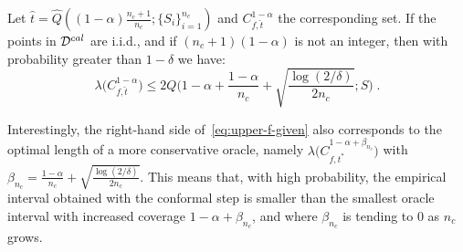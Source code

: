 \begin{proposition}
    \label{prop:upper-f-given}
    Let $\hat{t} = \widehat{Q}((1-\alpha)\frac{n_c+1}{n_c};\{S_i\}_{i=1}^{n_c})$ and $C^{1-\alpha}_{f,\hat{t}}$ the corresponding set. If the points in ${\cal D}^{cal}$ are i.i.d., and if $(n_c+1)(1-\alpha)$ is not an integer, then with probability greater than $1-\delta$ we have:
    \begin{equation}
        \label{eq:upper-f-given}
        \lambda\Big(C^{1-\alpha}_{f,\hat{t}}\Big) \leq 2Q\Big(1-\alpha + \frac{1-\alpha}{n_c} + \sqrt{\frac{\log(2/\delta)}{2n_c}}; S\Big)\;.
    \end{equation}
\end{proposition}

Interestingly, the right-hand side of~\eqref{eq:upper-f-given} also corresponds to the optimal length of a more conservative oracle, namely $\lambda\Big(C^{1-\alpha+\beta_{n_c}}_{f,t^*}\Big)$ with $\beta_{n_c}=\frac{1-\alpha}{n_c} + \sqrt{\frac{\log(2/\delta)}{2n_c}}$. This means that, with high probability, the empirical interval obtained with the conformal step is smaller than the smallest oracle interval with increased coverage $1-\alpha+\beta_{n_c}$, and where $\beta_{n_c}$ is tending to $0$ as $n_c$ grows.

